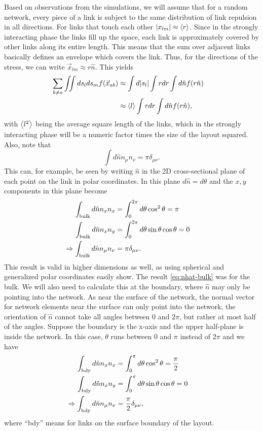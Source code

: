 \documentclass[endfloats,nofootinbib,preprint,floatfix,titlepage,superscriptaddress,linenumbers]{revtex4-1} %
\begin{document}
Based on observations from the simulations, we will assume that for a random network, every piece of a link is subject to the same distribution of link repulsion in all directions. 
For links that touch each other $|x_{lm}| \approx \left<r\right>$. 
Since in the strongly interacting phase the links fill up the space, each link is approximately covered by other links along its entire length. This means that the sum over adjacent links basically defines an envelope which covers the link.
Thus, for the directions of the stress,  we can write $\vec{x}_{lm} \approx  r\hat{n}$. 
This yields 
\begin{align}
    \sum_{b\ne a} \iint ds_lds_m f(\vec{x}_{ab}) &  \approx \int d|s_l| \int r dr \int d\hat{n} f(r\hat{n})\cr 
    & \approx  \left<l\right>\int rdr\int d\hat{n} f(r\hat{n}),
    \label{eq:apr-int}
\end{align}
with $\left<l^2\right>$ being the average square length of the links, which in the strongly interacting phase will be a numeric factor times the size of the layout squared. 
Also, note that 
\begin{equation}
\int d\hat{n} n_\mu n_\nu =\pi \delta_{\mu\nu}. 
\end{equation}
This can, for example, be seen by writing $\hat{n}$ in the 2D cross-sectional plane of each point on the link in polar coordinates. 
In this plane $d\hat{n} = d\theta $ and  the $x,y$ components in this plane become
\begin{align}
    \int_\mathrm{bulk} d\hat{n} n_x n_x & = 
    \int_0^{2\pi} d\theta \cos^2 \theta = \pi \cr
    \int_\mathrm{bulk} d\hat{n} n_x n_y & = \int_0^{2\pi} d\theta \sin \theta \cos \theta = 0 \cr 
    \Rightarrow  \int_\mathrm{bulk} d\hat{n} n_\mu n_\nu & = \pi \delta_{\mu\nu}.
    \label{eq:nhat-bulk}
\end{align}
This result is valid in higher dimensions as well, as using spherical and generalized polar coordinates easily show. 
The result \eqref{eq:nhat-bulk} was for the bulk.
We will also need to calculate this at the boundary, where $\hat{n} $ may only be pointing into the network. 
As near the surface of the network, the normal vector for network elements near the surface can only point into the network, the orientation of $\hat{n}$ cannot take all angles between 0 and $2\pi$, but rather at most half of the angles. 
Suppose the boundary is the x-axis and the upper half-plane is inside the network.
In this case, $\theta$ runs between $0$ and $\pi$ instead of $2\pi$ and we have 
\begin{align}
    \int_\mathrm{bdy} d\hat{n} n_x n_x & = 
    \int_0^\pi d\theta \cos^2 \theta = {\pi\over 2}  \cr
    \int_\mathrm{bdy} d\hat{n} n_x n_y & = \int_0^\pi d\theta \sin \theta \cos \theta = 0 \cr 
    \Rightarrow  \int_\mathrm{bdy} d\hat{n} n_\mu n_\nu & = {\pi\over 2} \delta_{\mu\nu}, 
    \label{eq:nhat-bdy}
\end{align}
where ``bdy'' means for links on the surface boundary of the layout. 
\end{document}
